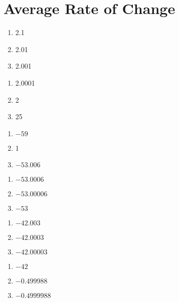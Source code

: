 \section*{Average Rate of Change}
\begin{multicols}{3}
\begin{enumerate}
\item 2.1
\item 2.01
\item 2.001
\end{enumerate}	\setcounter{Review}{\value{enumi}}
\end{multicols}
\begin{multicols}{3}
\begin{enumerate}	\setcounter{enumi}{\value{Review}} 
\item 2.0001
\item 2
\item 25
\end{enumerate}	\setcounter{Review}{\value{enumi}}
\end{multicols}
\begin{multicols}{3}
\begin{enumerate}	\setcounter{enumi}{\value{Review}} 
\item $-59$
\item 1
\item $-53.006$
\end{enumerate}	\setcounter{Review}{\value{enumi}}
\end{multicols}
\begin{multicols}{3}
\begin{enumerate}	\setcounter{enumi}{\value{Review}} 
\item $-53.0006$
\item $-53.00006$
\item $-53$
\end{enumerate}	\setcounter{Review}{\value{enumi}}
\end{multicols}
\begin{multicols}{3}
\begin{enumerate}	\setcounter{enumi}{\value{Review}} 
\item $-42.003$
\item $-42.0003$
\item $-42.00003$
\end{enumerate}	\setcounter{Review}{\value{enumi}}
\end{multicols}
\begin{multicols}{3}
\begin{enumerate}	\setcounter{enumi}{\value{Review}} 
\item $-42$
\item $-0.499988$
\item $-0.4999988$
\end{enumerate}	\setcounter{Review}{\value{enumi}}
\end{multicols}
